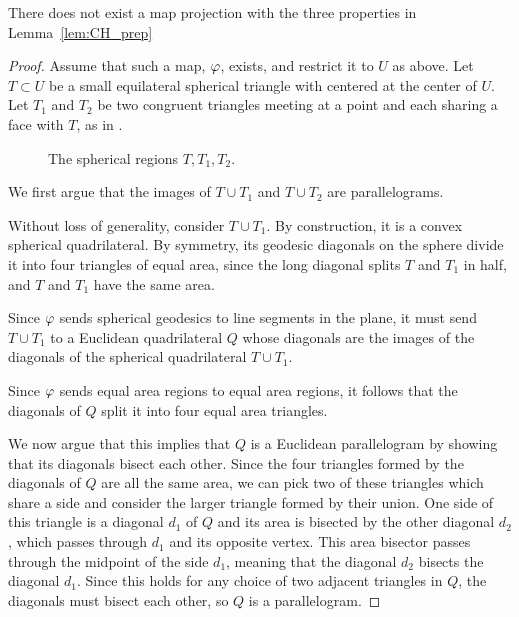 \begin{theorem}
	There does not exist a map projection with the three properties in Lemma~\ref{lem:CH_prep}
\end{theorem}
\begin{proof}
	Assume that such a map, $\varphi$, exists, and restrict 
	it to $U$ as above. Let $T\subset U$ be a 
	small equilateral spherical  triangle with centered at 
	the center of $U$. Let $T_1$ and $T_2$ be two 
	congruent triangles meeting at a point and 
	each sharing a face with $T$, as in .

\begin{figure}[!htb]
	\centering
	
	\caption{The spherical regions $T,T_1,T_2$.}
	\label{fig:sphtris}
\end{figure}












We first argue that the images of $T\cup T_1$ and $T\cup T_2$ are parallelograms.

Without loss of generality, consider $T\cup T_1$.  By construction, it is a 
convex spherical quadrilateral. By symmetry, its geodesic 
diagonals on the sphere divide it into four triangles of equal area, since the long diagonal splits $T$ and $T_1$ in 
half, and $T$ and $T_1$ have the same area.


		Since $\varphi$ sends spherical geodesics to line segments in the plane, it must send 
		$T\cup T_1$ to a Euclidean quadrilateral $Q$ whose diagonals 
		are the images of the diagonals of the spherical quadrilateral $T\cup T_1$.
		
		 Since 
		$\varphi$ sends equal area regions to equal area 
		regions, it follows that the diagonals 
		of $Q$ split it into four equal area triangles.
		
		We now argue that this implies that $Q$ is a Euclidean parallelogram by showing that its diagonals bisect each other.  Since the four triangles 
		formed by the diagonals of $Q$ are all the same area, we can pick two of these triangles which share a side 
		and consider the larger triangle formed by their union.  One side of this triangle is a diagonal $d_1$ of $Q$ and its area is 
		bisected by the other diagonal $d_2$, which passes through $d_1$ and its opposite vertex.  This area bisector passes through the midpoint of the side $d_1$, meaning that the diagonal $d_2$ bisects the diagonal $d_1$.  Since this holds for any choice of two adjacent triangles in $Q$, the diagonals must bisect each other, so $Q$ is a parallelogram.
		

\end{proof}
